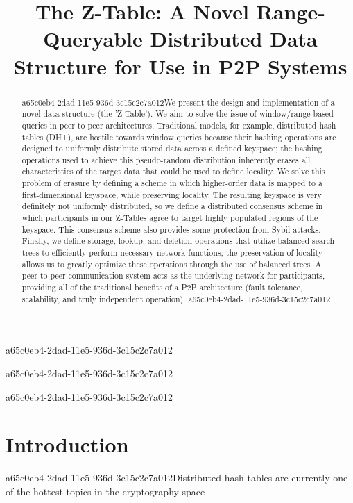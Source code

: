 \documentclass[12pt]{article}
\title{The Z-Table: A Novel Range-Queryable Distributed Data Structure for Use in P2P Systems}
\begin{document}
a65c0eb4-2dad-11e5-936d-3c15c2c7a012\maketitle
a65c0eb4-2dad-11e5-936d-3c15c2c7a012
\begin{abstract}
a65c0eb4-2dad-11e5-936d-3c15c2c7a012We present the design and implementation of a novel data structure (the 'Z-Table'). We aim to solve the issue of window/range-based queries in peer to peer architectures. Traditional models, for example,  distributed hash tables (DHT), are hostile towards window queries because their hashing operations are designed to uniformly distribute stored data across a defined keyspace; the hashing operations used to achieve this pseudo-random distribution inherently erases all characteristics of the target data that could be used to define locality. We solve this problem of erasure by defining a scheme in which higher-order data is mapped to a first-dimensional keyspace, while preserving locality. The resulting keyspace is very definitely not uniformly distributed, so we define a distributed consensus scheme in which participants in our Z-Tables agree to target highly populated regions of the keyspace. This consensus scheme also provides some protection from Sybil attacks. Finally, we define storage, lookup, and deletion operations that utilize balanced search trees to efficiently perform necessary network functions; the preservation of locality allows us to greatly optimize these operations through the use of balanced trees. A peer to peer communication system acts as the underlying network for participants, providing all of the traditional benefits of a P2P architecture (fault tolerance, scalability, and truly independent operation).
a65c0eb4-2dad-11e5-936d-3c15c2c7a012\end{abstract}

a65c0eb4-2dad-11e5-936d-3c15c2c7a012
\newpage
\section{Introduction}
a65c0eb4-2dad-11e5-936d-3c15c2c7a012Distributed hash tables are currently one of the hottest topics in the cryptography space~\cite{Stoica:2001dj,Rowstron:2001ea,Ratnasamy:2001wn}

\printbibliography
\end{document}
